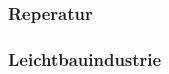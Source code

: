 \documentclass[12pt]{article}
\begin{document}
\subsubsection{Reperatur}
\subsubsection{Leichtbauindustrie}

\pagebreak
\pagebreak
\printnoidxglossary[type=\acronymtype]
\pagebreak
\printbibliography
\pagebreak
\listoffigures
\end{document}
